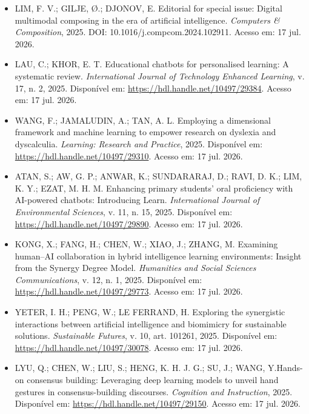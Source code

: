 \documentclass[english]{textolivre}
\begin{document}
\begin{itemize}
\item[] LIM, F. V.; GILJE, Ø.; DJONOV, E. Editorial for special issue: Digital multimodal composing in the era of artificial intelligence. \textit{Computers \& Composition}, 2025. DOI: 10.1016/j.compcom.2024.102911. Acesso em: 17 jul. 2026.

\item[] LAU, C.; KHOR, E. T. Educational chatbots for personalised learning: A systematic review. \textit{International Journal of Technology Enhanced Learning}, v. 17, n. 2, 2025. Disponível em: \url{https://hdl.handle.net/10497/29384}. Acesso em: 17 jul. 2026.

\item[] WANG, F.; JAMALUDIN, A.; TAN, A. L. Employing a dimensional framework and machine learning to empower research on dyslexia and dyscalculia. \textit{Learning: Research and Practice}, 2025. Disponível em: \url{https://hdl.handle.net/10497/29310}. Acesso em: 17 jul. 2026.

\item[] ATAN, S.; AW, G. P.; ANWAR, K.; SUNDARARAJ, D.; RAVI, D. K.; LIM, K. Y.; EZAT, M. H. M. Enhancing primary students' oral proficiency with AI-powered chatbots: Introducing Learn. \textit{International Journal of Environmental Sciences}, v. 11, n. 15, 2025. Disponível em: \url{https://hdl.handle.net/10497/29890}. Acesso em: 17 jul. 2026.

\item[] KONG, X.; FANG, H.; CHEN, W.; XIAO, J.; ZHANG, M. Examining human--AI collaboration in hybrid intelligence learning environments: Insight from the Synergy Degree Model. \textit{Humanities and Social Sciences Communications}, v. 12, n. 1, 2025. Disponível em: \url{https://hdl.handle.net/10497/29773}. Acesso em: 17 jul. 2026.

\item[] YETER, I. H.; PENG, W.; LE FERRAND, H. Exploring the synergistic interactions between artificial intelligence and biomimicry for sustainable solutions. \textit{Sustainable Futures}, v. 10, art. 101261, 2025. Disponível em: \url{https://hdl.handle.net/10497/30078}. Acesso em: 17 jul. 2026.

\item[] LYU, Q.; CHEN, W.; LIU, S.; HENG, K. H. J. G.; SU, J.; WANG, Y.Hands-on consensus building: Leveraging deep learning models to unveil hand gestures in consensus-building discourses. \textit{Cognition and Instruction}, 2025. Disponível em: \url{https://hdl.handle.net/10497/29150}. Acesso em: 17 jul. 2026.


\end{itemize}
\end{document}
